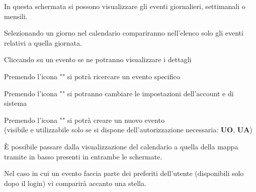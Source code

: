 \documentclass{article}
\begin{document}
\begin{description}
\begin{center}
          \end{center}
    \item[] In questa schermata si possono visualizzare gli eventi giornalieri, settimanali o mensili.
    \item[] Selezionando un giorno nel calendario compariranno nell'elenco solo gli eventi relativi a quella giornata.
    \item[] Cliccando su un evento se ne potranno visualizzare i dettagli
    \item[] Premendo l'icona "" si potrà ricercare un evento specifico
    \item[] Premendo l'icona "" si potranno cambiare le impostazioni dell'account e di sistema
    \item[] Premendo l'icona "" si potrà creare un nuovo evento \\ (visibile e utilizzabile solo se si dispone dell'autorizzazione necessaria: \textbf{UO}, \textbf{UA})
    \item[] È possibile passare dalla visualizzazione del calendario a quella della mappa tramite in basso presenti in entrambe le schermate.
    \item[] Nel caso in cui un evento faccia parte dei preferiti dell'utente (disponibili solo dopo il login) vi comparirà accanto una stella.
\end{description}
\end{document}
